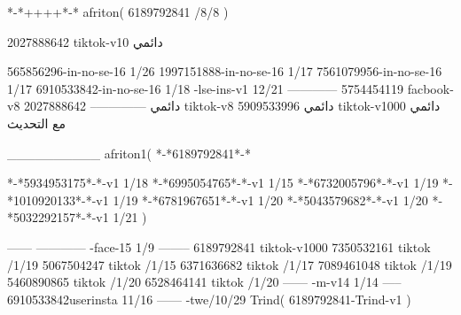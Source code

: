 *-*++++*-*
afriton(
6189792841 /8/8
)

2027888642 tiktok-v10
دائمي

565856296-in-no-se-16 1/26
1997151888-in-no-se-16 1/17
7561079956-in-no-se-16 1/17
6910533842-in-no-se-16 1/18
-lse-ins-v1 12/21
------------
5754454119 facbook-v8
دائمي
--------------
2027888642 tiktok-v8
دائمي
5909533996 tiktok-v1000
دائمي مع التحديث

__________
afriton1(
*-*6189792841*-*


*-*5934953175*-*-v1 1/18
*-*6995054765*-*-v1 1/15
*-*6732005796*-*-v1 1/19
*-*1010920133*-*-v1 1/19
*-*6781967651*-*-v1 1/20
*-*5043579682*-*-v1 1/20
*-*5032292157*-*-v1 1/21
)

------
------------
-face-15 1/9
--------
6189792841 tiktok-v1000
7350532161 tiktok /1/19
5067504247 tiktok /1/15
6371636682 tiktok /1/17
7089461048 tiktok /1/19
5460890865 tiktok /1/20
6528464141 tiktok /1/20
------
-m-v14 1/14
-----
6910533842userinsta 11/16
------
-twe/10/29
Trind(
6189792841-Trind-v1 
)
